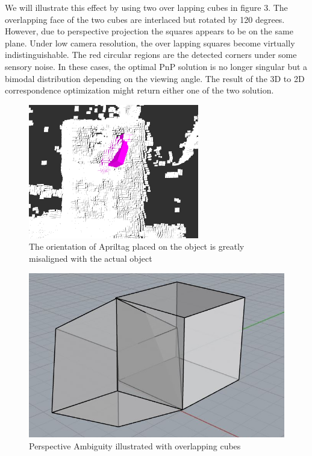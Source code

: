 We will illustrate this effect by using two over lapping cubes in figure 3.  The overlapping face of the two cubes are interlaced but rotated by 120 degrees. However, due to perspective projection the squares appears to be on the same plane. Under low camera resolution, the over lapping squares become virtually indistinguishable. The red circular regions are the detected corners under some sensory noise. In these cases, the optimal PnP solution is no longer singular but a bimodal distribution depending on the viewing angle. The result of the 3D to 2D correspondence optimization might return either one of the two solution. 
\begin{figure}
\centering
\includegraphics[width=\columnwidth]{figs/mismatch_tag}
\caption{The orientation of Apriltag placed on the object is greatly misaligned with the actual object}
\label{fig:calib}
\end{figure}

\begin{figure}
\centering
\includegraphics[width=\columnwidth]{figs/perspective_fig}
\caption{Perspective Ambiguity illustrated with overlapping cubes}
\label{fig:calib}
\end{figure}